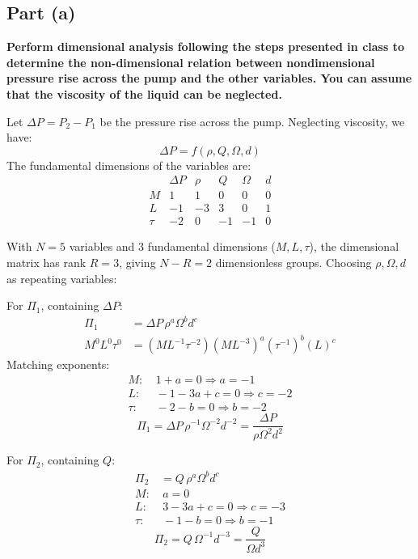\documentclass[12pt]{article}
\begin{document}
\subsection*{Part (a)}
\textbf{Perform dimensional analysis following the steps presented in class to determine the non-dimensional relation between nondimensional pressure rise across the pump and the other variables. You can assume that the viscosity of the liquid can be neglected.}

Let $\Delta P = P_2 - P_1$ be the pressure rise across the pump. Neglecting viscosity, we have:
\begin{equation*}
    \Delta P = f(\rho, Q, \Omega, d)
\end{equation*}
The fundamental dimensions of the variables are:
\begin{equation*}
    \begin{array}{c|ccccc}
        & \Delta P & \rho & Q & \Omega & d \\
        \hline
        M & 1 & 1 & 0 & 0 & 0 \\
        L & -1 & -3 & 3 & 0 & 1 \\
        \tau & -2 & 0 & -1 & -1 & 0
    \end{array}
\end{equation*}

With $N = 5$ variables and 3 fundamental dimensions ($M, L, \tau$), the dimensional matrix has rank $R = 3$, giving $N - R = 2$ dimensionless groups. Choosing $\rho, \Omega, d$ as repeating variables:

For $\Pi_1$, containing $\Delta P$:
\begin{align*}
    \Pi_1 &= \Delta P\, \rho^a \Omega^b d^c \\
    M^0 L^0 \tau^0 &= (M L^{-1} \tau^{-2})(M L^{-3})^a (\tau^{-1})^b (L)^c
\end{align*}
Matching exponents:
\begin{align*}
    M:&\ 1 + a = 0 \Rightarrow a = -1 \\
    L:&\ -1 - 3a + c = 0 \Rightarrow c = -2 \\
    \tau:&\ -2 - b = 0 \Rightarrow b = -2
\end{align*}
\begin{equation}
    \Pi_1 = \Delta P\, \rho^{-1} \Omega^{-2} d^{-2} = \frac{\Delta P}{\rho \Omega^2 d^2}
\end{equation}

For $\Pi_2$, containing $Q$:
\begin{align*}
    \Pi_2 &= Q\, \rho^a \Omega^b d^c \\
    M:&\ a = 0 \\
    L:&\ 3 - 3a + c = 0 \Rightarrow c = -3 \\
    \tau:&\ -1 - b = 0 \Rightarrow b = -1
\end{align*}
\begin{equation}
    \Pi_2 = Q\, \Omega^{-1} d^{-3} = \frac{Q}{\Omega d^3}
\end{equation}
\end{document}
